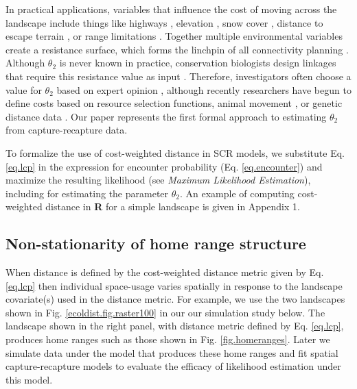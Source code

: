 \documentclass[12pt]{article}
\begin{document}
\begin{spacing}{1.8}
In practical applications, variables that influence the cost of moving
across the landscape include things like highways
\citep[e.g.,][]{epps_etal:2005}, elevation \citep{cushman_etal:2006},
 snow cover
\citep{schwartz_etal:2009}, distance to escape terrain
\citep{shirk_etal:2010}, or range limitations
\citep{mcrae_beier:2007}.  Together multiple environmental variables
create a resistance surface, which forms the linchpin of all
connectivity planning \citep{spear_etal:2010}.
 Although $\theta_{2}$ is never known in practice,
conservation biologists design linkages that require this resistance
value as input \citep[see][and articles cited
therein]{beier_etal:2008}.
Therefore, investigators often choose a value for $\theta_{2}$
based on
expert opinion \citep{beier_etal:2008}, although recently researchers
have begun to define costs based on resource selection functions,
animal movement \citep{tracy:2006, fortin_etal:2005}, or genetic
distance data \citep{gerlach_musolf:2000,
schwartz_etal:2009}. Our paper represents the first formal approach
to estimating $\theta_{2}$ from capture-recapture data.

To formalize the use of cost-weighted distance in SCR models, we
substitute Eq. \ref{eq.lcp} in the expression for encounter
probability (Eq. \ref{eq.encounter}) and maximize the resulting
likelihood (see {\it Maximum Likelihood Estimation}), including for estimating the
parameter $\theta_{2}$. An example of computing cost-weighted distance
in {\bf R} for a simple landscape is given in Appendix 1.


\subsection{Non-stationarity of home range structure}

When distance is defined by the cost-weighted distance metric given
by Eq. \ref{eq.lcp} then individual space-usage varies
spatially in response to the landscape covariate(s) used in the
distance metric. For example, we use the two landscapes shown in
Fig. \ref{ecoldist.fig.raster100}
in our
our simulation study below. The landscape shown in the right panel, with
distance
metric defined by Eq. \ref{eq.lcp}, produces home ranges such
as those shown in Fig. \ref{fig.homeranges}. Later we simulate data
under the model that produces these home ranges and fit spatial
capture-recapture models to evaluate the efficacy of likelihood
estimation under this model.





\end{spacing}
\end{document}
